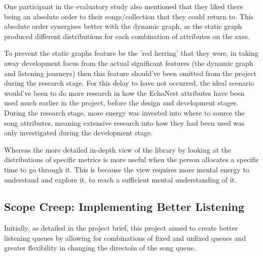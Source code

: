 One participant in the evaluatory study also mentioned that they liked there being an absolute order to their songs/collection that they could return to. This absolute order synergises better with the dynamic graph, as the static graph produced different distributions for each combination of attributes on the axes.

To prevent the static graphs feature be the 'red herring' that they were, in taking away development focus from the actual significant features (the dynamic graph and listening journeys) then this feature should've been omitted from the project during the research stage.
For this delay to have not occurred, the ideal scenario would've been to do more research in how the EchoNest attributes have been used much earlier in the project, before the design and development stages. 
During the research stage, more energy was invested into where to source the song attributes, meaning extensive research into how they had been used was only investigated during the development stage.



Whereas the more detailed in-depth view of the library by looking at the distributions of specific metrics is more useful when the person allocates a specific time to go through it.
This is because the view requires more mental energy to understand and explore it, to reach a sufficient mental understanding of it.

\subsection{Scope Creep: Implementing Better Listening}
Initially, as detailed in the project brief, this project aimed to create better listening queues by allowing for combinations of fixed and unfixed queues and greater flexibility in changing the directoin of the song queue.


